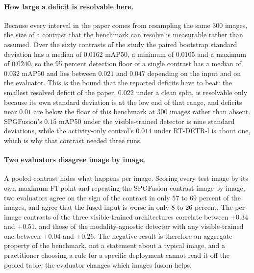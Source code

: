 \documentclass[preprint,10pt]{elsarticle}
\begin{document}
\begin{sloppypar}
\paragraph{How large a deficit is resolvable here.} Because every interval in the paper
comes from resampling the same 300 images, the size of a contrast that the benchmark can
resolve is measurable rather than assumed. Over the sixty contrasts of the study the
paired bootstrap standard deviation has a median of $0.0162$ mAP50, a minimum of
$0.0105$ and a maximum of $0.0240$, so the 95 percent detection floor of a single
contrast has a median of $0.032$ mAP50 and lies between $0.021$ and $0.047$ depending
on the input and on the evaluator. This is the bound that the reported deficits have to
beat: the smallest resolved deficit of the paper, $0.022$ under a clean split, is
resolvable only because its own standard deviation is at the low end of that range, and
deficits near $0.01$ are below the floor of this benchmark at 300 images rather than
absent. SPGFusion's $0.15$ mAP50 under the visible-trained detector is nine standard
deviations, while the activity-only control's $0.014$ under RT-DETR-l is about one,
which is why that contrast needed three runs.

\paragraph{Two evaluators disagree image by image.} A pooled contrast hides what
happens per image. Scoring every test image by its own maximum-F1 point and repeating
the SPGFusion contrast image by image, two evaluators agree on the sign of the contrast
in only $57$ to $69$ percent of the images, and agree that the fused input is worse in
only $8$ to $26$ percent. The per-image contrasts of the three visible-trained
architectures correlate between $+0.34$ and $+0.51$, and those of the modality-agnostic
detector with any visible-trained one between $+0.04$ and $+0.26$. The negative result
is therefore an aggregate property of the benchmark, not a statement about a typical
image, and a practitioner choosing a rule for a specific deployment cannot read it off
the pooled table: the evaluator changes which images fusion helps.


\end{sloppypar}
\end{document}
